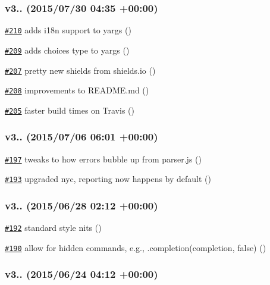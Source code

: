 \subsubsection*{v3.. (2015/07/30 04\+:35 +00\+:00)}


\begin{DoxyItemize}
\item \href{https://github.com/bcoe/yargs/pull/210}{\tt \#210} adds i18n support to yargs ()
\item \href{https://github.com/bcoe/yargs/pull/209}{\tt \#209} adds choices type to yargs ()
\item \href{https://github.com/bcoe/yargs/pull/207}{\tt \#207} pretty new shields from shields.\+io ()
\item \href{https://github.com/bcoe/yargs/pull/208}{\tt \#208} improvements to R\+E\+A\+D\+M\+E.\+md ()
\item \href{https://github.com/bcoe/yargs/pull/205}{\tt \#205} faster build times on Travis ()
\end{DoxyItemize}

\subsubsection*{v3.. (2015/07/06 06\+:01 +00\+:00)}


\begin{DoxyItemize}
\item \href{https://github.com/bcoe/yargs/pull/197}{\tt \#197} tweaks to how errors bubble up from parser.\+js ()
\item \href{https://github.com/bcoe/yargs/pull/193}{\tt \#193} upgraded nyc, reporting now happens by default ()
\end{DoxyItemize}

\subsubsection*{v3.. (2015/06/28 02\+:12 +00\+:00)}


\begin{DoxyItemize}
\item \href{https://github.com/bcoe/yargs/pull/192}{\tt \#192} standard style nits ()
\item \href{https://github.com/bcoe/yargs/pull/190}{\tt \#190} allow for hidden commands, e.\+g., .completion(\textquotesingle{}completion\textquotesingle{}, false) ()
\end{DoxyItemize}

\subsubsection*{v3.. (2015/06/24 04\+:12 +00\+:00)}


